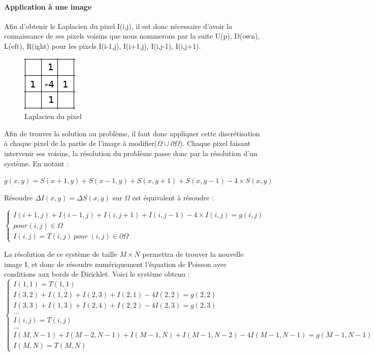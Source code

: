 \paragraph{Application à une image }
Afin d'obtenir le Laplacien du pixel I(i,j), il est donc nécessaire d'avoir la connaissance de ses pixels voisins que nous nommerons par la suite U(p), D(own), L(eft), R(ight) pour les pixels I(i-1,j), I(i+1,j), I(i,j-1), I(i,j+1). 

\begin{figure}[!h]
\centering
    \includegraphics[scale = 0.8]{Images/Laplacian.png}
    \caption{Laplacien du pixel}
\end{figure}
Afin de trouver la solution au problème, il faut donc appliquer cette discrétisation à chaque pixel de la partie de l'image à modifier($\Omega \cup \partial \Omega$). Chaque pixel faisant intervenir ses voisins, la résolution du problème passe donc par la résolution d'un système.
En notant :
\begin{center}
 $g(x,y) = S(x+1,y) + S(x-1,y)+ S(x,y+1) + S(x,y-1) - 4\times S(x,y)$\\
 \end{center}
Résoudre $\Delta I(x,y) = \Delta S(x,y)$ sur $\Omega$ est équivalent à résoudre :\\
\begin{center}
\begin{equation*}
    \left \{
    \begin{aligned}
    I(i+1,j) + I(i-1,j)+ I(i,j+1) + I(i, j-1) - 4\times 			I(i,j)= g(i,j)\\ pour (i,j)\in \Omega \\
    I(i,j) = T(i,j) \ pour \ (i,j) \in \partial \Omega
    \end{aligned}
    \right.
\end{equation*}
\end{center}
La résolution de ce système de taille $M\times N $ permettra de trouver la nouvelle image I, et donc de résoudre numériquement l'équation de Poisson avec conditions aux bords de Dirichlet. Voici le système obtenu : 
\begin{equation}
\left\{
\begin{aligned}
I(1,1) = T(1,1)\\
I(3,2)+I(1,2)+ I(2,3)+I(2,1)-4I(2,2) =g(2,2) \\
I(3,3)+I(1,3)+ I(2,4)+I(2,2)-4I(2,3) =g(2,3)             \\
...\\
I(i,j) = T(i,j)\\
... \\
I(M,N-1)+I(M-2,N-1)+ I(M-1,N)+I(M-1,N-2)-4I(M-1,N-1) =g(M-1,N-1)\\
I(M, N) = T(M, N)
\end{aligned}
\right.
\end{equation}
